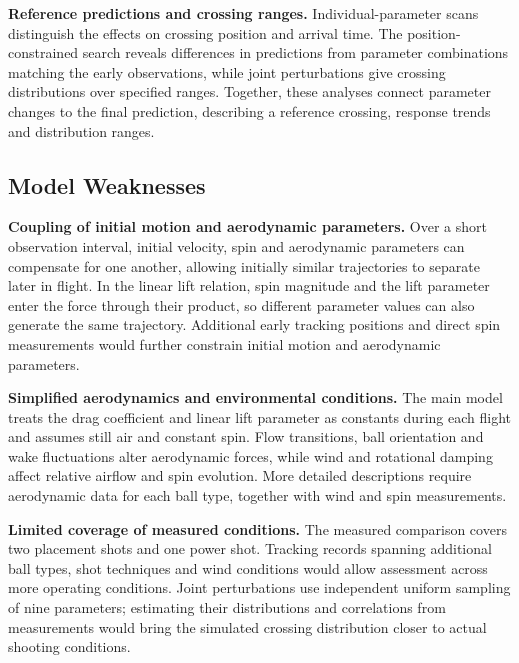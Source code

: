\documentclass[12pt,letterpaper]{article}
\begin{document}
\textbf{Reference predictions and crossing ranges.} Individual-parameter scans distinguish the effects on crossing position and arrival time. The position-constrained search reveals differences in predictions from parameter combinations matching the early observations, while joint perturbations give crossing distributions over specified ranges. Together, these analyses connect parameter changes to the final prediction, describing a reference crossing, response trends and distribution ranges.

\subsection{Model Weaknesses}

\noindent\hspace*{\parindent}\textbf{Coupling of initial motion and aerodynamic parameters.} Over a short observation interval, initial velocity, spin and aerodynamic parameters can compensate for one another, allowing initially similar trajectories to separate later in flight. In the linear lift relation, spin magnitude and the lift parameter enter the force through their product, so different parameter values can also generate the same trajectory. Additional early tracking positions and direct spin measurements would further constrain initial motion and aerodynamic parameters.

\textbf{Simplified aerodynamics and environmental conditions.} The main model treats the drag coefficient and linear lift parameter as constants during each flight and assumes still air and constant spin. Flow transitions, ball orientation and wake fluctuations alter aerodynamic forces, while wind and rotational damping affect relative airflow and spin evolution. More detailed descriptions require aerodynamic data for each ball type, together with wind and spin measurements.

\textbf{Limited coverage of measured conditions.} The measured comparison covers two placement shots and one power shot. Tracking records spanning additional ball types, shot techniques and wind conditions would allow assessment across more operating conditions. Joint perturbations use independent uniform sampling of nine parameters; estimating their distributions and correlations from measurements would bring the simulated crossing distribution closer to actual shooting conditions.
\end{document}
